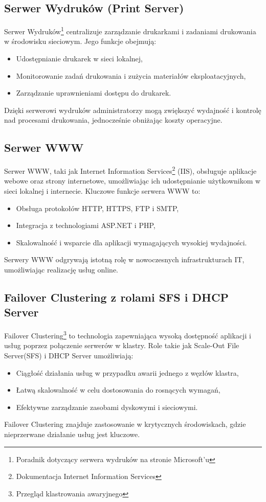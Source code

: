 \subsection{Serwer Wydruków (Print Server)}
Serwer Wydruków\footnote{Poradnik dotyczący serwera wydruków na stronie Microsoft'u\cite{print_server}} centralizuje zarządzanie drukarkami i zadaniami drukowania w środowisku sieciowym. Jego funkcje obejmują:
\begin{itemize}
	\item Udostępnianie drukarek w sieci lokalnej,
\item Monitorowanie zadań drukowania i zużycia materiałów eksploatacyjnych,
\item Zarządzanie uprawnieniami dostępu do drukarek.
\end{itemize}
Dzięki serwerowi wydruków administratorzy mogą zwiększyć wydajność i kontrolę nad procesami drukowania, jednocześnie obniżając koszty operacyjne.

\subsection{Serwer WWW}
Serwer WWW, taki jak Internet Information Services\footnote{Dokumentacja Internet Information Services\cite{iis}} (IIS), obsługuje aplikacje webowe oraz strony internetowe, umożliwiając ich udostępnianie użytkownikom w sieci lokalnej i internecie. Kluczowe funkcje serwera WWW to:
\begin{itemize}
	\item Obsługa protokołów HTTP, HTTPS, FTP i SMTP,
\item Integracja z technologiami ASP.NET i PHP,
\item Skalowalność i wsparcie dla aplikacji wymagających wysokiej wydajności.
\end{itemize}
Serwery WWW odgrywają istotną rolę w nowoczesnych infrastrukturach IT, umożliwiając realizację usług online.

\subsection{Failover Clustering z rolami SFS i DHCP Server}
Failover Clustering\footnote{Przegląd klastrowania awaryjnego\cite{failover_clustering}} to technologia zapewniająca wysoką dostępność aplikacji i usług poprzez połączenie serwerów w klastry. Role takie jak Scale-Out File Server(SFS) i DHCP Server umożliwiają:
\begin{itemize}
	\item Ciągłość działania usług w przypadku awarii jednego z węzłów klastra,
    \item Łatwą skalowalność w celu dostosowania do rosnących wymagań,
    \item Efektywne zarządzanie zasobami dyskowymi i sieciowymi.
\end{itemize}
Failover Clustering znajduje zastosowanie w krytycznych środowiskach, gdzie nieprzerwane działanie usług jest kluczowe.

